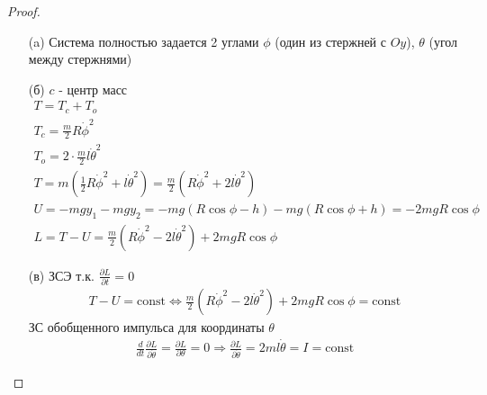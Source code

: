 \begin{proof}
\begin{itemize}
\item[]
\item[(a)] Система полностью задается 2 углами $\phi$ (один из стержней с $O y$), $\theta$ (угол между стержнями)
\item[(б)]
    $c$ - центр масс 
    \begin{gather*}
        T = T_{c} + T_{o}\\
        T_{c} = \frac{m}{2} R \dot{\phi}^2\\
        T_{o} = 2 \cdot \frac{m}{2} l \dot{\theta}^2\\
        T = m (\frac{1}{2} R \dot{\phi}^2 + l \dot{\theta}^2)
        = \frac{m}{2} (R \dot{\phi}^2 + 2 l \dot{\theta}^2)\\
        U = -mg y_1 - mg y_2
        = -mg(R \cos \phi - h) - mg(R \cos \phi + h)
        = -2mgR \cos \phi\\
        L = T - U = \frac{m}{2}(R \dot{\phi}^2 - 2 l \dot{\theta}^2) + 2mgR \cos \phi
    \end{gather*}
\item[(в)]
    ЗСЭ т.к. $\frac{\partial L}{\partial t} = 0$ 
    \begin{gather*}
            T - U = \text{const} \Leftrightarrow
            \frac{m}{2}(R \dot{\phi}^2 - 2 l \dot{\theta}^2) + 2mgR \cos \phi = \text{const}
    \end{gather*}
    ЗС обобщенного импульса для координаты $\theta$
    \begin{gather*}
        \frac{d}{dt} \frac{\partial L}{\partial \dot{\theta}}
        = \frac{\partial L}{\partial \theta}
        = 0 \Rightarrow
        \frac{\partial L}{\partial \dot{\theta}}
        = 2ml \dot{\theta}
        = I = \text{const}
    \end{gather*}
\end{itemize}
\end{proof}